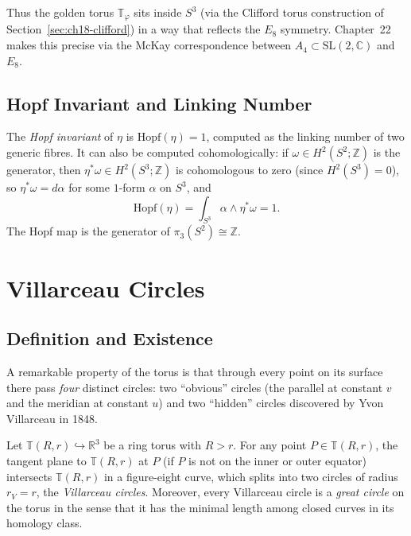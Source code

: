 Thus the golden torus $\mathbb{T}_\varphi$ sits inside $S^3$ (via the Clifford
torus construction of Section~\ref{sec:ch18-clifford}) in a way that reflects
the $E_8$ symmetry.
Chapter~22 \cite{Coxeter1973} makes this precise via the McKay correspondence
between $A_4 \subset \mathrm{SL}(2,\mathbb{C})$ and $E_8$.

\subsection{Hopf Invariant and Linking Number}\label{subsec:ch18-hopf-invariant}

The \emph{Hopf invariant} of $\eta$ is $\mathrm{Hopf}(\eta) = 1$, computed
as the linking number of two generic fibres.
It can also be computed cohomologically: if $\omega \in H^2(S^2;\mathbb{Z})$
is the generator, then $\eta^*\omega \in H^2(S^3;\mathbb{Z})$ is cohomologous
to zero (since $H^2(S^3) = 0$), so $\eta^*\omega = d\alpha$ for some
$1$-form $\alpha$ on $S^3$, and
\begin{equation}\label{eq:hopf-invariant}
  \mathrm{Hopf}(\eta) = \int_{S^3} \alpha \wedge \eta^*\omega = 1.
\end{equation}
The Hopf map is the generator of $\pi_3(S^2) \cong \mathbb{Z}$.

\section{Villarceau Circles}
\label{sec:ch18-villarceau}

\subsection{Definition and Existence}\label{subsec:ch18-villarceau-def}

A remarkable property of the torus is that through every point on its surface
there pass \emph{four} distinct circles: two ``obvious'' circles
(the parallel at constant $v$ and the meridian at constant $u$) and two
``hidden'' circles discovered by Yvon Villarceau in 1848.

\begin{theorem}\label{thm:villarceau}
Let $\mathbb{T}(R,r) \hookrightarrow \mathbb{R}^3$ be a ring torus with $R > r$.
For any point $P \in \mathbb{T}(R,r)$, the tangent plane to $\mathbb{T}(R,r)$
at $P$ (if $P$ is not on the inner or outer equator) intersects $\mathbb{T}(R,r)$
in a figure-eight curve, which splits into two circles of radius $r_V = r$,
the \emph{Villarceau circles}.
Moreover, every Villarceau circle is a \emph{great circle} on the torus in the
sense that it has the minimal length among closed curves in its homology class.
\end{theorem}

